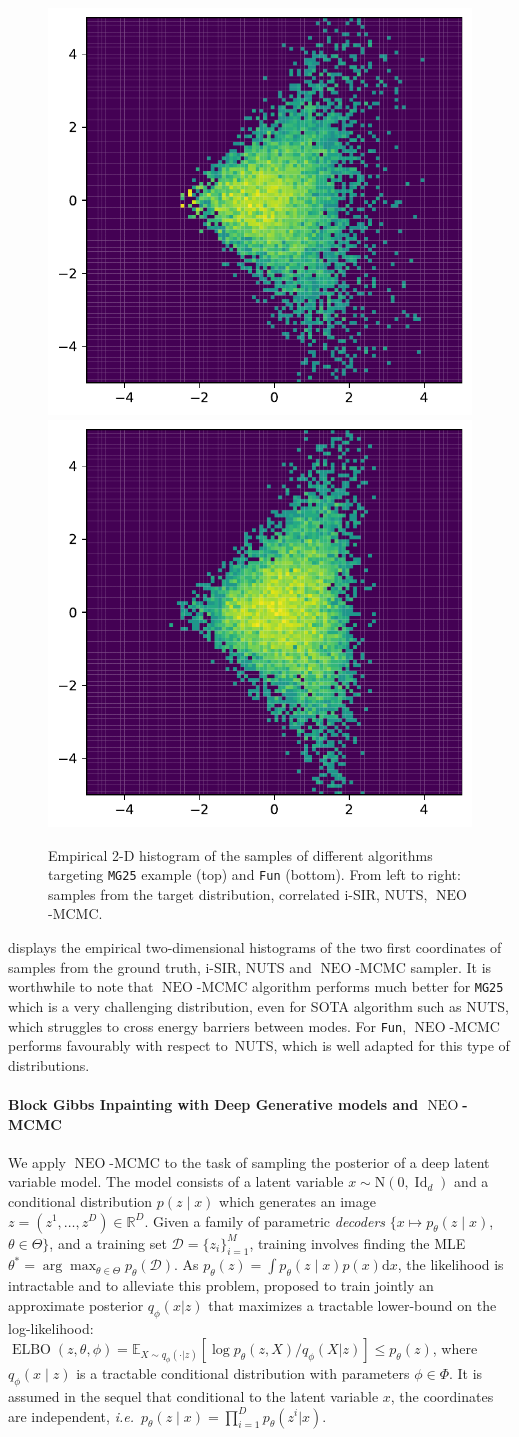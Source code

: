 \documentclass{article}
\def\Normal{\mathrm{N}}
\def\IFIS{\ensuremath{\operatorname{NEO}}}
\def\InFiNE{{\small \IFIS}}
\def\NEO{{\small \IFIS}}
\def\rmd{\operatorname{d}\hspace{-2pt}}
\def\Id{\operatorname{Id}}
\def\PE{\mathbb{E}}
\def\ELBO{\operatorname{ELBO}}
\def\rset{\mathbb{R}}
\def\rmd{\mathrm{d}}
\def\wrt{w.r.t.}
\def\ie{\textit{i.e.}}
\newcommand{\1}{\mathds{1}}
\def\Id{\operatorname{Id}}
\def\Id{\operatorname{Id}}
\def\rset{\mathbb{R}}
\def\rmd{\mathrm{d}}
\def\wrt{with respect to}
\def\obs{z}
\def\argmax{ \arg \max}
\begin{document}
\begin{figure}[!ht]
         \hspace{1pt}   \includegraphics[width=.22\linewidth]{histogram_nuts_funnel1_crop.pdf}
             \hspace{1pt}
        \includegraphics[width=.22\linewidth]{histogram_infine_funnel2_crop.pdf}
     \caption{Empirical 2-D histogram of the samples of different algorithms targeting \texttt{MG25}  example (top) and  \texttt{Fun} (bottom).  From left to right: samples from the target distribution, correlated i-SIR, NUTS, \IFIS-MCMC.}
    \label{fig:samples_mcmc}
\end{figure}
 displays the empirical two-dimensional histograms of the two first coordinates of samples from the ground truth, i-SIR, NUTS and \InFiNE-MCMC sampler. It is worthwhile to note that \NEO-MCMC algorithm performs much better for \texttt{MG25} which is a very challenging distribution, even for SOTA algorithm such as NUTS, which struggles to cross energy barriers between modes. For \texttt{Fun}, \NEO-MCMC performs favourably  \wrt\ NUTS, which is well adapted for this type of distributions.

\paragraph{Block Gibbs Inpainting with Deep Generative models and \IFIS-MCMC}
\label{subsec:gibbs_inpaint}
We apply \NEO-MCMC to the task of sampling the posterior of a deep latent variable model.
The model consists of a latent variable $x\sim \Normal(0, \Id_d)$ and a conditional distribution $p(\obs\mid x)$ which generates an image $\obs = (\obs^1,\dots, \obs^D) \in \rset^D$.  
Given a family of parametric \emph{decoders} $\{x\mapsto p_\theta(\obs\mid x)$, $\theta\in\Theta\}$, and a training set  $\mathcal{D}=\{\obs_i\}_{i=1}^{M}$, training involves finding the MLE $\theta^* = \argmax_{\theta \in \Theta} p_\theta(\mathcal{D})$.  As $p_\theta(\obs) =\int p_\theta(\obs\mid x)p(x)\rmd x$, the likelihood is intractable and to alleviate this problem, \cite{kingma:welling:2013} proposed to train jointly an approximate posterior $q_\phi(x|\obs)$ that maximizes a tractable lower-bound on the log-likelihood: $\ELBO(\obs,\theta,\phi) = \PE_{X \sim q_\phi( \cdot |\obs)}[\log p_\theta(\obs,X)/q_\phi(X|\obs)] \leq p_\theta(\obs)$, where $q_\phi(x\mid \obs)$ is a tractable conditional distribution with parameters $\phi \in \Phi$. It is assumed in the sequel that conditional to the latent variable $x$, the coordinates are independent, \ie\ $p_{\theta}(\obs \mid x)= \prod_{i=1}^{D} p_\theta(\obs^i | x)$.
\end{document}
